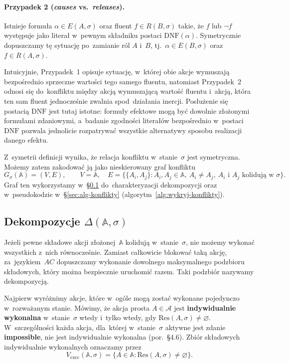 \documentclass[11pt,a4paper]{article}
\newcommand{\impossible}{\textbf{impossible}}
\newcommand{\DNF}{\mathrm{DNF}}
\theoremstyle{definition}
\begin{document}
\paragraph{Przypadek 2 (\textit{causes} vs.\ \textit{releases}).}
Istnieje formuła $\alpha \in E(A,\sigma)$ oraz fluent $f \in R(B,\sigma)$
takie, że $f$ lub $\neg f$ występuje jako literał w~pewnym składniku
postaci $\DNF(\alpha)$. Symetrycznie dopuszczamy tę sytuację po~zamianie
ról $A$ i~$B$, tj.\ $\alpha \in E(B,\sigma)$ oraz $f \in R(A,\sigma)$.

\medskip
Intuicyjnie, Przypadek~1 opisuje sytuację, w~której obie akcje wymuszają
bezpośrednio sprzeczne wartości tego samego fluentu, natomiast Przypadek~2
odnosi się do~konfliktu między akcją wymuszającą wartość fluentu i~akcją,
która ten sam fluent jednocześnie zwalnia spod~działania inercji.
Posłużenie się postacią $\DNF$ jest tutaj istotne: formuły efektowe mogą
być dowolnie złożonymi formułami zdaniowymi, a~badanie zgodności literałów
bezpośrednio w~postaci $\DNF$ pozwala jednolicie rozpatrywać wszystkie
alternatywy sposobu realizacji danego efektu.

Z~symetrii definicji wynika, że relacja konfliktu w~stanie~$\sigma$
jest symetryczna. Możemy zatem zakodować ją jako nieskierowany graf
konfliktu
\[
  G_\sigma(\mathbb{A}) = (V, E),
  \qquad V = \mathbb{A},
  \quad
  E = \{\{A_i, A_j\} : A_i, A_j \in \mathbb{A},\ A_i \neq A_j,
        \ A_i \text{ i } A_j \text{ kolidują w~} \sigma\}.
\]
Graf ten wykorzystamy w~\S\ref{sec:dekompozycje} do~charakteryzacji
dekompozycji oraz w~pseudokodzie w~\S\ref{sec:alg-konflikty} (algorytm~\ref{alg:wykryj-konflikty}).

\subsection{Dekompozycje \texorpdfstring{$\Delta(\mathbb{A}, \sigma)$}{Delta(A,sigma)}}
\label{sec:dekompozycje}

Jeżeli pewne składowe akcji złożonej~$\mathbb{A}$ kolidują w~stanie~$\sigma$,
nie możemy wykonać wszystkich z~nich równocześnie. Zamiast całkowicie
blokować taką akcję, za~językiem~$AC$ dopuszczamy wykonanie dowolnego
maksymalnego podzbioru składowych, który można bezpiecznie uruchomić
razem. Taki podzbiór nazywamy dekompozycją.

Najpierw wyróżnimy akcje, które w~ogóle mogą zostać wykonane pojedynczo
w~rozważanym stanie. Mówimy, że akcja prosta $A \in \mathcal{A}$ jest
\textbf{indywidualnie wykonalna} w~stanie~$\sigma$ wtedy i~tylko wtedy,
gdy $\mathrm{Res}(A,\sigma) \neq \varnothing$. W~szczególności każda
akcja, dla~której w~stanie~$\sigma$ aktywne jest zdanie \impossible{},
nie jest indywidualnie wykonalna (por.~\S4.6). Zbiór składowych
indywidualnie wykonalnych oznaczamy przez
\[
  V_{\mathrm{exec}}(\mathbb{A},\sigma)
    = \{A \in \mathbb{A} : \mathrm{Res}(A,\sigma) \neq \varnothing\}.
\]
\end{document}
